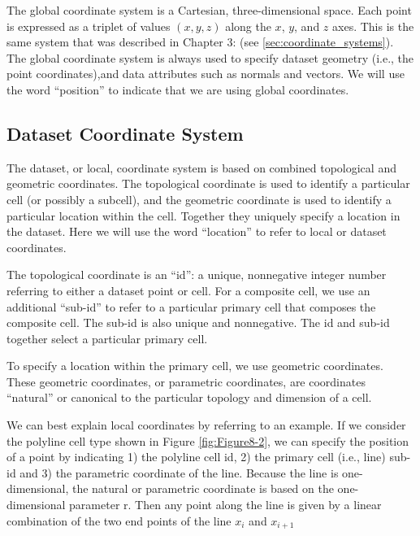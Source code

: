 The global coordinate system is a Cartesian, three-dimensional space. Each point is expressed as a triplet of values $(x,y,z)$ along the $x$, $y$, and $z$ axes.
This is the same system that was described in Chapter 3:  (see \ref{sec:coordinate_systems}).
The global coordinate system is always used to specify dataset geometry (i.e., the point coordinates),and data attributes such as normals and vectors.
We will use the word ``position'' to indicate that we are using global coordinates.

\subsection{Dataset Coordinate System}

The dataset, or local, coordinate system is based on combined topological and geometric coordinates. The topological coordinate is used to identify a particular cell (or possibly a subcell), and the geometric coordinate is used to identify a particular location within the cell. Together they uniquely specify a location in the dataset. Here we will use the word ``location'' to refer to local or dataset coordinates.

The topological coordinate is an ``id'': a unique, nonnegative integer number referring to either a dataset point or cell. For a composite cell, we use an additional ``sub-id'' to refer to a particular primary cell that composes the composite cell. The sub-id is also unique and nonnegative. The id and sub-id together select a particular primary cell.

To specify a location within the primary cell, we use geometric coordinates. These geometric coordinates, or parametric coordinates, are coordinates ``natural'' or canonical to the particular topology and dimension of a cell.

We can best explain local coordinates by referring to an example. If we consider the polyline cell type shown in Figure \ref{fig:Figure8-2}, we can specify the position of a point by indicating 1) the polyline cell id, 2) the primary cell (i.e., line) sub-id and 3) the parametric coordinate of the line. Because the line is one-dimensional, the natural or parametric coordinate is based on the one-dimensional parameter r. Then any point along the line is given by a linear combination of the two end points of the line $x_i$ and $x_{i+1}$

